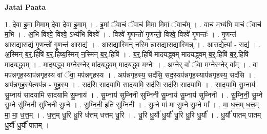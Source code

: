 \documentclass[17pt]{extarticle}
\begin{document}
\textbf{Jatai Paata} \newline

1. दे॒वा इ॒मा मि॒माम् दे॒वा दे॒वा इ॒माम् । . इ॒मां ॅवाचं॒ ॅवाच॑ मि॒मा मि॒मां ॅवाच᳚म् । . वाच॑ म॒भ्य॑भि वाचं॒ ॅवाच॑ म॒भि । . अ॒भि विश्वे॒ विश्वे॒ ऽभ्य॑भि विश्वे᳚ । . विश्वे॑ गृ॒णन्तो॑ गृ॒णन्तो॒ विश्वे॒ विश्वे॑ गृ॒णन्तः॑ । . गृ॒णन्त॑ आ॒सद्या॒सद्य॑ गृ॒णन्तो॑ गृ॒णन्त॑ आ॒सद्य॑ । . आ॒सद्या॒स्मिन् न॒स्मि न्ना॒सद्या॒सद्या॒स्मिन्न् । . आ॒सद्येत्या᳚ - सद्य॑ । . अ॒स्मिन् ब॒र्॒.हिषि॑ ब॒र्॒.हिष्य॒स्मिन् न॒स्मिन् ब॒र्॒.हिषि॑ । . ब॒र्॒.हिषि॑ मादयद्ध्वम् मादयद्ध्वम् ब॒र्॒.हिषि॑ ब॒र्॒.हिषि॑ मादयद्ध्वम् । . मा॒द॒य॒द्ध्व॒ म॒ग्नेर॒ग्नेर् मा॑दयद्ध्वम् मादयद्ध्व म॒ग्नेः । . अ॒ग्नेर् वां᳚ ॅवा म॒ग्नेर॒ग्नेर् वा᳚म् । . वा॒ मप॑न्नगृह॒स्याप॑न्नगृहस्य वां ॅवा॒ मप॑न्नगृहस्य । . अप॑न्नगृहस्य॒ सद॑सि॒ सद॒स्यप॑न्नगृह॒स्याप॑न्नगृहस्य॒ सद॑सि । . अप॑न्नगृह॒स्येत्यप॑न्न - गृ॒ह॒स्य॒ । . सद॑सि सादयामि सादयामि॒ सद॑सि॒ सद॑सि सादयामि । . सा॒द॒या॒मि॒ सु॒म्नाय॑ सु॒म्नाय॑ सादयामि सादयामि सु॒म्नाय॑ । . सु॒म्नाय॑ सुम्निनी सुम्निनी सु॒म्नाय॑ सु॒म्नाय॑ सुम्निनी । . सु॒म्नि॒नी॒ सु॒म्ने सु॒म्ने सु॑म्निनी सुम्निनी सु॒म्ने । . सु॒म्नि॒नी॒ इति॑ सुम्निनी । . सु॒म्ने मा॑ मा सु॒म्ने सु॒म्ने मा᳚ । . मा॒ ध॒त्त॒म् ध॒त्त॒म् मा॒ मा॒ ध॒त्त॒म् । . ध॒त्त॒म् धु॒रि धु॒रि ध॑त्तम् धत्तम् धु॒रि । . धु॒रि धु॒र्यौ॑ धु॒र्यौ॑ धु॒रि धु॒रि धु॒र्यौ᳚ । . धु॒र्यौ॑ पातम् पातम् धु॒र्यौ॑ धु॒र्यौ॑ पातम् । \newline
\end{document}
